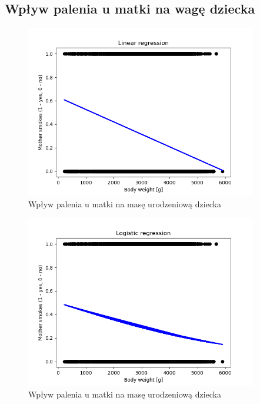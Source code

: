 \documentclass{classrep}
\begin{document}
    \subsection{Wpływ palenia u matki na wagę dziecka}
        \begin{figure}[H]
            \centering
            \includegraphics[width=0.9\textwidth]{images/images2/LinearRegression.png}
            \caption{Wpływ palenia u matki na masę urodzeniową dziecka}
            \label{fig1}
        \end{figure}
        
        \begin{figure}[H]
            \centering
            \includegraphics[width=0.9\textwidth]{images/images2/LogisticRegression.png}
            \caption{Wpływ palenia u matki na masę urodzeniową dziecka}
            \label{fig2}
        \end{figure}
\end{document}
